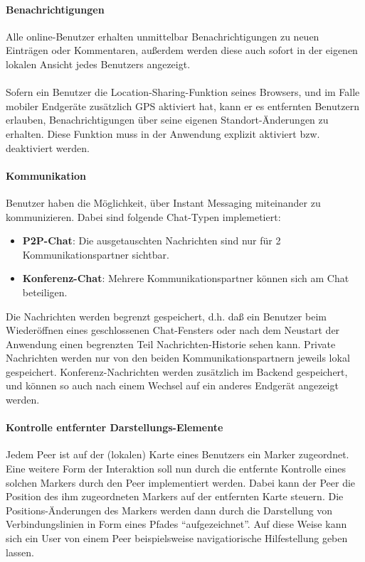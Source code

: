 \paragraph{Benachrichtigungen}
Alle online-Benutzer erhalten unmittelbar Benachrichtigungen zu neuen Einträgen oder Kommentaren, außerdem werden diese auch sofort in der eigenen lokalen Ansicht jedes Benutzers angezeigt.\\ \\
Sofern ein Benutzer die Location-Sharing-Funktion seines Browsers, und im Falle mobiler Endgeräte zusätzlich GPS aktiviert hat, kann er es entfernten Benutzern erlauben, Benachrichtigungen über seine eigenen Standort-Änderungen zu erhalten. Diese Funktion muss in der Anwendung explizit aktiviert bzw. deaktiviert werden.

\paragraph{Kommunikation}
Benutzer haben die Möglichkeit, über Instant Messaging miteinander zu kommunizieren. Dabei sind
folgende Chat-Typen implemetiert:
\begin{itemize}[leftmargin=*,noitemsep,topsep=1ex,parsep=0pt,partopsep=0pt]
\item \textbf{P2P-Chat}: Die ausgetauschten Nachrichten sind nur für 2 Kommunikationspartner sichtbar.
\item \textbf{Konferenz-Chat}: Mehrere Kommunikationspartner können sich am Chat beteiligen.
\end{itemize}
Die Nachrichten werden begrenzt gespeichert, d.h. daß ein Benutzer beim Wiederöffnen eines  geschlossenen Chat-Fensters oder nach dem Neustart der Anwendung einen begrenzten Teil Nachrichten-Historie sehen kann.
Private Nachrichten werden nur von den beiden Kommunikationspartnern jeweils lokal gespeichert. Konferenz-Nachrichten werden zusätzlich im Backend gespeichert, und können so auch nach einem Wechsel auf ein anderes Endgerät angezeigt werden.

\paragraph{Kontrolle entfernter Darstellungs-Elemente}
Jedem Peer ist auf der (lokalen) Karte eines Benutzers ein Marker zugeordnet. 
Eine weitere Form der Interaktion soll nun durch die entfernte Kontrolle eines solchen Markers durch den Peer implementiert werden. Dabei kann der Peer die Position des ihm zugeordneten Markers auf der entfernten Karte steuern. Die Positions-Änderungen des Markers werden dann durch die Darstellung von Verbindungslinien in Form eines Pfades "`aufgezeichnet"'. Auf diese Weise kann sich ein User von einem Peer beispielsweise navigatiorische Hilfestellung geben lassen.


